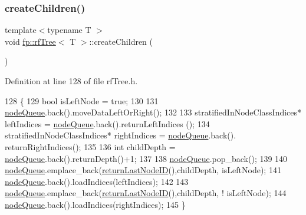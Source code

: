\subsubsection{\texorpdfstring{create\+Children()}{createChildren()}\hspace{0.1cm}{\footnotesize\ttfamily [1/2]}}
{\footnotesize\ttfamily template$<$typename T $>$ \\
void \hyperlink{classfp_1_1rfTree}{fp\+::rf\+Tree}$<$ T $>$\+::create\+Children (\begin{DoxyParamCaption}{ }\end{DoxyParamCaption})\hspace{0.3cm}{\ttfamily [inline]}}



Definition at line 128 of file rf\+Tree.\+h.


\begin{DoxyCode}
128                                             \{
129                     \textcolor{keywordtype}{bool} isLeftNode = \textcolor{keyword}{true};
130 
131                     \hyperlink{classfp_1_1rfTree_af72d0a2f930fd480dfb4858885c2df23}{nodeQueue}.back().moveDataLeftOrRight();
132 
133                     stratifiedInNodeClassIndices* leftIndices = \hyperlink{classfp_1_1rfTree_af72d0a2f930fd480dfb4858885c2df23}{nodeQueue}.back().returnLeftIndices
      ();
134                     stratifiedInNodeClassIndices* rightIndices = \hyperlink{classfp_1_1rfTree_af72d0a2f930fd480dfb4858885c2df23}{nodeQueue}.back().
      returnRightIndices();
135 
136                     \textcolor{keywordtype}{int} childDepth = \hyperlink{classfp_1_1rfTree_af72d0a2f930fd480dfb4858885c2df23}{nodeQueue}.back().returnDepth()+1;
137 
138                     \hyperlink{classfp_1_1rfTree_af72d0a2f930fd480dfb4858885c2df23}{nodeQueue}.pop\_back();
139 
140                     \hyperlink{classfp_1_1rfTree_af72d0a2f930fd480dfb4858885c2df23}{nodeQueue}.emplace\_back(\hyperlink{classfp_1_1rfTree_a1b8c04f3f3ce362d9627c2ca66d10efd}{returnLastNodeID}(),childDepth, 
      isLeftNode);
141                     \hyperlink{classfp_1_1rfTree_af72d0a2f930fd480dfb4858885c2df23}{nodeQueue}.back().loadIndices(leftIndices);
142 
143                     \hyperlink{classfp_1_1rfTree_af72d0a2f930fd480dfb4858885c2df23}{nodeQueue}.emplace\_back(\hyperlink{classfp_1_1rfTree_a1b8c04f3f3ce362d9627c2ca66d10efd}{returnLastNodeID}(),childDepth, !
      isLeftNode);
144                     \hyperlink{classfp_1_1rfTree_af72d0a2f930fd480dfb4858885c2df23}{nodeQueue}.back().loadIndices(rightIndices);
145                 \}
\end{DoxyCode}
